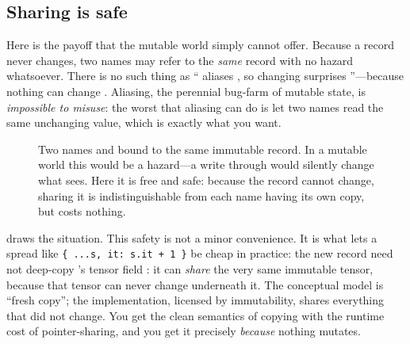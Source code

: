 \subsection{Sharing is safe}

Here is the payoff that the mutable world simply cannot offer. Because a record
never changes, two names may refer to the \emph{same} record with no hazard
whatsoever. There is no such thing as `` aliases , so changing
 surprises ''---because nothing can change . Aliasing,
the perennial bug-farm of mutable state, is \emph{impossible to misuse}: the worst
that aliasing can do is let two names read the same unchanging value, which is
exactly what you want.

\begin{figure}[t]
\centering
{}
\caption[Safe sharing]{Two names  and  bound to the same
immutable record. In a mutable world this would be a hazard---a write through
 would silently change what  sees. Here it is free and safe:
because the record cannot change, sharing it is indistinguishable from each name
having its own copy, but costs nothing.}
\label{fig:sharing}
\end{figure}

 draws the situation. This safety is not a minor convenience.
It is what lets a spread like \lstinline[style=l4style]|{ ...s, it: s.it + 1 }|
be cheap in practice: the new record need not deep-copy 's tensor field
: it can \emph{share} the very same immutable tensor, because that tensor
can never change underneath it. The conceptual model is ``fresh copy''; the
implementation, licensed by immutability, shares everything that did not change.
You get the clean semantics of copying with the runtime cost of pointer-sharing,
and you get it precisely \emph{because} nothing mutates.

